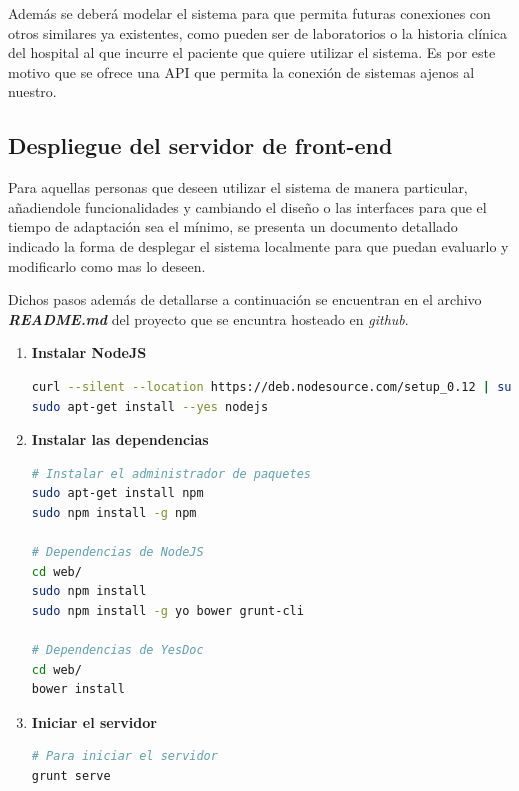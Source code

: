 \documentclass[a4paper,12pt]{article}
\begin{document}
Además se deberá modelar el sistema para que permita futuras conexiones con otros similares ya existentes, como pueden ser de laboratorios o la historia clínica del hospital al que incurre el paciente que quiere utilizar el sistema. Es por este motivo que se ofrece una API que permita la conexión de sistemas ajenos al nuestro.


\subsection{Despliegue del servidor de front-end}
Para aquellas personas que deseen utilizar el sistema de manera particular, añadiendole funcionalidades y cambiando el diseño o las interfaces para que el tiempo de adaptación sea el mínimo, se presenta un documento detallado indicado la forma de desplegar el sistema localmente para que puedan evaluarlo y modificarlo como mas lo deseen.

Dichos pasos además de detallarse a continuación se encuentran en el archivo \textit{\textbf{README.md}} del proyecto que se encuntra hosteado en \textit{github}.
\begin{enumerate}
\item \textbf{ Instalar NodeJS}

\begin{lstlisting}[language=bash]
curl --silent --location https://deb.nodesource.com/setup_0.12 | sudo bash -
sudo apt-get install --yes nodejs

\end{lstlisting}
\item \textbf{Instalar las dependencias}
\begin{lstlisting}[language=bash]
# Instalar el administrador de paquetes
sudo apt-get install npm
sudo npm install -g npm

# Dependencias de NodeJS
cd web/
sudo npm install
sudo npm install -g yo bower grunt-cli

# Dependencias de YesDoc
cd web/
bower install
\end{lstlisting}
\item \textbf{Iniciar el servidor}
\begin{lstlisting}[language=bash]
# Para iniciar el servidor
grunt serve
\end{lstlisting}


\end{enumerate}
\end{document}
